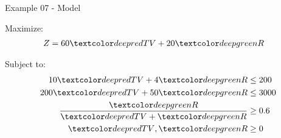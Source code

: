 \begin{frame}{Example 07 - Model}

Maximize:
\begin{align*}
    Z &= 60\colora{TV} + 20\colorb{R}
\end{align*}

Subject to:
\begin{align*}
    10 \colora{TV} + 4 \colorb{R} &\le 200 \\
    200\colora{TV} + 50\colorb{R} &\le 3000 \\
    \frac{\colorb{R}}{\colora{TV} + \colorb{R}} &\ge 0.6 \\
    \colora{TV}, \colorb{R} &\ge 0
\end{align*}

\end{frame}
